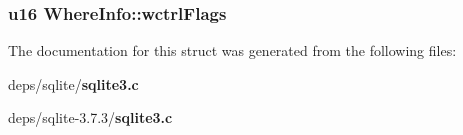 \subsubsection{\setlength{\rightskip}{0pt plus 5cm}\bf{u16} \bf{Where\-Info::wctrl\-Flags}}\label{structWhereInfo_c82d572b145db3f73259bbe875dc43a3}




The documentation for this struct was generated from the following files:\begin{CompactItemize}
\item 
deps/sqlite/\bf{sqlite3.c}\item 
deps/sqlite-3.7.3/\bf{sqlite3.c}\end{CompactItemize}
